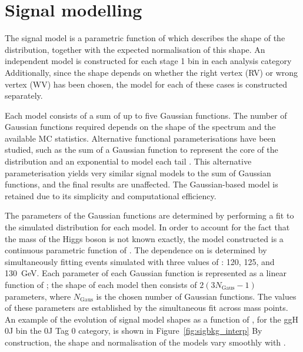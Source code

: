 \section{Signal modelling}

The signal model is a parametric function of \mH which describes the shape of the \mgg distribution, 
together with the expected normalisation of this shape.
An independent model is constructed for each stage 1 bin in each analysis category
Additionally, since the \mgg shape depends on whether the right vertex (RV) 
or wrong vertex (WV) has been chosen, the model for each of these cases is constructed separately.

Each model consists of a sum of up to five Gaussian functions.
The number of Gaussian functions required depends on the shape of the \mgg spectrum 
and the available MC statistics.
Alternative functional parameterisations have been studied, 
such as the sum of a Gaussian function to represent the core of the \mgg distribution 
and an exponential to model each tail \cite{LouieThesis}.
This alternative parameterisation yields very similar signal models to the sum of Gaussian functions, 
and the final results are unaffected.
The Gaussian-based model is retained due to its simplicity and computational efficiency.

The parameters of the Gaussian functions are determined by performing a fit 
to the simulated \mgg distribution for each model.
In order to account for the fact that the mass of the Higgs boson is not known exactly, 
the model constructed is a continuous parametric function of \mH.
The dependence on \mH is determined by simultaneously fitting events simulated with 
three values of \mH: 120, 125, and \SI{130}{GeV}.
Each parameter of each Gaussian function is represented as a linear function of \mH; 
the shape of each model then consists of $2\left(3N_{\textrm{Gaus}}-1\right)$ parameters, 
where $N_{\textrm{Gaus}}$ is the chosen number of Gaussian functions.
The values of these parameters are established by the simultaneous fit across mass points.
An example of the evolution of signal model shapes as a function of \mH, 
for the ggH 0J bin the 0J Tag 0 category, is shown in Figure~\ref{fig:sigbkg_interp}
By construction, the shape and normalisation of the models vary smoothly with \mH.

